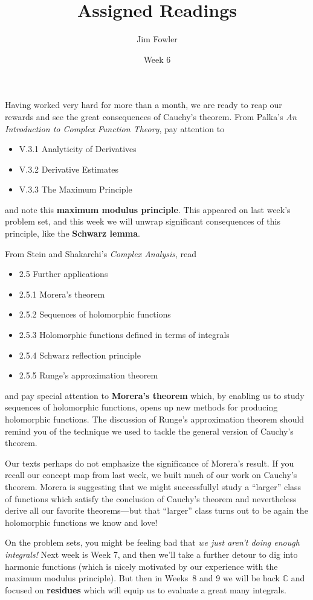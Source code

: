 \documentclass{homework}
\author{Jim Fowler}
\title{Assigned Readings}
\date{Week 6}
\begin{document}
\maketitle

Having worked very hard for more than a month, we are ready to reap
our rewards and see the great consequences of Cauchy's theorem.  From
Palka's \textit{An Introduction to Complex Function Theory}, pay
attention to
\begin{itemize}
\item V.3.1 Analyticity of Derivatives
\item V.3.2 Derivative Estimates
\item V.3.3 The Maximum Principle
\end{itemize}
and note this \textbf{maximum modulus principle}.  This appeared on
last week's problem set, and this week we will unwrap significant
consequences of this principle, like the \textbf{Schwarz lemma}.

From Stein and Shakarchi's \textit{Complex Analysis}, read
\begin{itemize}
\item 2.5 Further applications
\item 2.5.1 Morera's theorem
\item 2.5.2 Sequences of holomorphic functions
\item 2.5.3 Holomorphic functions defined in terms of integrals
\item 2.5.4 Schwarz reflection principle
\item 2.5.5 Runge's approximation theorem
\end{itemize}
and pay special attention to \textbf{Morera's theorem} which, by
enabling us to study sequences of holomorphic functions, opens up new
methods for producing holomorphic functions.  The discussion of
Runge's approximation theorem should remind you of the technique we
used to tackle the general version of Cauchy's theorem.

Our texts perhaps do not emphasize the significance of Morera's
result.  If you recall our concept map from last week, we built much
of our work on Cauchy's theorem.  Morera is suggesting that we might
successfullyl study a ``larger'' class of functions which satisfy the
conclusion of Cauchy's theorem and nevertheless derive all our
favorite theorems---but that ``larger'' class turns out to be again
the holomorphic functions we know and love!

On the problem sets, you might be feeling bad that \textit{we just
  aren't doing enough integrals!}  Next week is Week 7, and then we'll
take a further detour to dig into harmonic functions (which is nicely
motivated by our experience with the maximum modulus principle).  But
then in Weeks~8 and 9 we will be back $\mathbb{C}$ and focused on
\textbf{residues} which will equip us to evaluate a great many
integrals.
\end{document}
